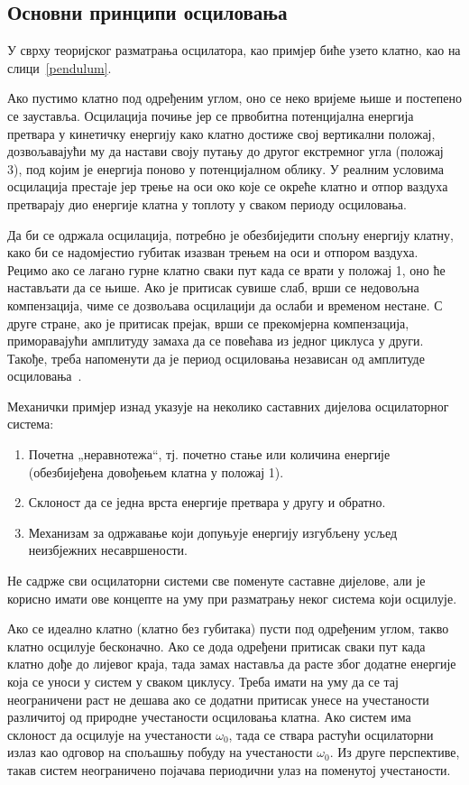\documentclass[master]{finthesis}
\begin{document}
\subsection{Основни принципи осциловања} 
У сврху теоријског разматрања осцилатора, као примјер биће узето клатно, као на слици~\ref{pendulum}. \par

Ако пустимо клатно под одређеним углом, оно се неко вријеме њише и постепено се зауставља. Осцилација почиње јер се првобитна потенцијална енергија претвара у кинетичку енергију како клатно достиже свој вертикални положај, дозвољавајући му да настави своју путању до другог екстремног угла (положај 3), под којим је енергија поново у потенцијалном облику. У реалним условима осцилација престаје јер трење на оси око које се окреће клатно и отпор ваздуха претварају дио енергије клатна у топлоту у сваком периоду осциловања. \par
Да би се одржала осцилација, потребно је обезбиједити спољну енергију клатну, како би се надомјестио губитак изазван трењем на оси и отпором ваздуха. Рецимо ако се лагано гурне клатно сваки пут када се врати у положај 1, оно ће настављати да се њише. Ако је притисак сувише слаб, врши се недовољна компензација, чиме се дозвољава осцилацији да ослаби и временом нестане. С друге стране, ако је притисак прејак, врши се прекомјерна компензација, приморавајући амплитуду замаха да се повећава из једног циклуса у други. Такође, треба напоменути да је период осциловања независан од амплитуде осциловања~\cite{Razavi:PLL_CMOS_2020}. \par
Механички примјер изнад указује на неколико саставних дијелова осцилаторног система:
\begin{enumerate}
	\item Почетна „неравнотежа“, тј. почетно стање или количина енергије (обезбијеђена довођењем клатна у положај 1).
	\item Склоност да се једна врста енергије претвара у другу и обратно.
	\item Механизам за одржавање који допуњује енергију изгубљену усљед неизбјежних несавршености.
\end{enumerate}
Не садрже сви осцилаторни системи све поменуте саставне дијелове, али је корисно имати ове концепте на уму при разматрању неког система који осцилује. \par
Ако се идеално клатно (клатно без губитака) пусти под одређеним углом, такво клатно осцилује бесконачно. Ако се дода одређени притисак сваки пут када клатно дође до лијевог краја, тада замах наставља да расте због додатне енергије која се уноси у систем у сваком циклусу. Треба имати на уму да се тај неограничени раст не дешава ако се додатни притисак унесе на учестаности различитој од природне учестаности осциловања клатна. Ако систем има склоност да осцилује на учестаности $\omega_{0}$, тада се ствара растући осцилаторни излаз као одговор на спољашњу побуду на учестаности $\omega_{0}$. Из друге перспективе, такав систем неограничено појачава периодични улаз на поменутој учестаности.
\end{document}
